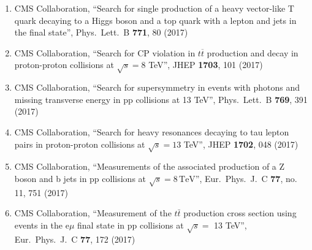 \begin{enumerate}
\item CMS Collaboration, ``Search for single production of a heavy vector-like T quark decaying to a Higgs boson and a top quark with a lepton and jets in the final state'', Phys.\ Lett.\ B {\bf 771}, 80 (2017)

\item CMS Collaboration, ``Search for CP violation in $ t\overline{t} $ production and decay in proton-proton collisions at $ \sqrt{s}=8 $ TeV'', JHEP {\bf 1703}, 101 (2017)

\item CMS Collaboration, ``Search for supersymmetry in events with photons and missing transverse energy in pp collisions at 13 TeV'', Phys.\ Lett.\ B {\bf 769}, 391 (2017)

\item CMS Collaboration, ``Search for heavy resonances decaying to tau lepton pairs in proton-proton collisions at $ \sqrt{s}=13 $ TeV'', JHEP {\bf 1702}, 048 (2017)

\item CMS Collaboration, ``Measurements of the associated production of a Z boson and b jets in pp collisions at ${\sqrt{s}} = 8\,\text {TeV} $'', Eur.\ Phys.\ J.\ C {\bf 77}, no. 11, 751 (2017)

\item CMS Collaboration, ``Measurement of the $t\bar{t}$ production cross section using events in the e$\mu$ final state in pp collisions at $\sqrt{s} =$ 13 TeV'', Eur.\ Phys.\ J.\ C {\bf 77}, 172 (2017)


\end{enumerate}

